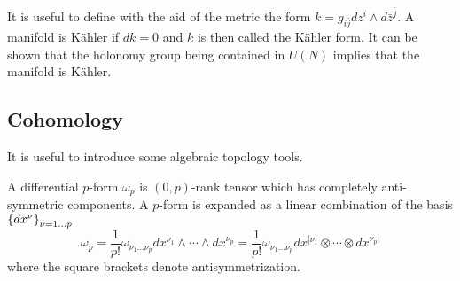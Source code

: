 It is useful to define with the aid of the metric the form $k=g_{i\bar j} dz^i \wedge d\bar z^{\bar j}$.
A manifold is Kähler if $dk=0$ and $k$ is then called the Kähler form.
It can be shown that the holonomy group being contained in $U(N)$ implies that the manifold is Kähler.

%
%
%
%
%
%


\subsection{Cohomology}

It is useful to introduce some algebraic topology tools.

A differential $p$-form $\omega_p$ is $(0,p)$-rank tensor which has completely anti-symmetric components.
A $p$-form is expanded as a linear combination of the basis $\qty{dx^\nu}_{\nu=1\ldots p}$ 
\begin{equation}
  \omega_p =\frac{1}{p!} \omega_{\nu_1\ldots\nu_p}dx^{\nu_1}\wedge \cdots  \wedge dx^{\nu_p} =
\frac{1}{p!} \omega_{\nu_1\ldots\nu_p}dx^{[ \nu_1}\otimes \cdots  \otimes dx^{\nu_p]}
\end{equation}
where the square brackets denote antisymmetrization.

